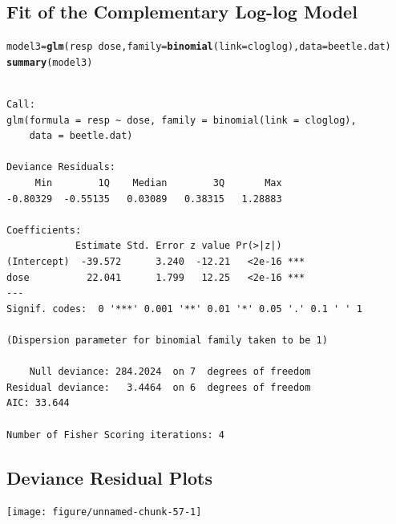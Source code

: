 \documentclass{article}\usepackage[]{graphicx}\usepackage[svgnames]{xcolor}
\makeatletter
\newcommand{\hlopt}[1]{\textcolor[rgb]{0,0,0}{#1}}%
\newcommand{\hlstd}[1]{\textcolor[rgb]{0.345,0.345,0.345}{#1}}%
\newcommand{\hlkwb}[1]{\textcolor[rgb]{0.69,0.353,0.396}{#1}}%
\newcommand{\hlkwc}[1]{\textcolor[rgb]{0.333,0.667,0.333}{#1}}%
\newcommand{\hlkwd}[1]{\textcolor[rgb]{0.737,0.353,0.396}{\textbf{#1}}}%
\newenvironment{kframe}{%
 \def\at@end@of@kframe{}%
 \ifinner\ifhmode%
  \def\at@end@of@kframe{\end{minipage}}%
  \begin{minipage}{\columnwidth}%
 \fi\fi%
 \def\FrameCommand##1{\hskip\@totalleftmargin \hskip-\fboxsep
 \colorbox{shadecolor}{##1}\hskip-\fboxsep
     \hskip-\linewidth \hskip-\@totalleftmargin \hskip\columnwidth}%
 \MakeFramed {\advance\hsize-\width
   \@totalleftmargin\z@ \linewidth\hsize
   \@setminipage}}%
 {\par\unskip\endMakeFramed%
 \at@end@of@kframe}
\newenvironment{knitrout}{}{} %
\makeatother
\begin{document}
\subsection*{Fit of the Complementary Log-log Model}
\begin{knitrout}
\color{fgcolor}\begin{kframe}
\begin{alltt}
\hlstd{model3} \hlkwb{=} \hlkwd{glm}\hlstd{(resp} \hlopt{~} \hlstd{dose,} \hlkwc{family} \hlstd{=} \hlkwd{binomial}\hlstd{(}\hlkwc{link} \hlstd{= cloglog),} \hlkwc{data} \hlstd{= beetle.dat)}
\hlkwd{summary}\hlstd{(model3)}
\end{alltt}
\begin{verbatim}

Call:
glm(formula = resp ~ dose, family = binomial(link = cloglog), 
    data = beetle.dat)

Deviance Residuals: 
     Min        1Q    Median        3Q       Max  
-0.80329  -0.55135   0.03089   0.38315   1.28883  

Coefficients:
            Estimate Std. Error z value Pr(>|z|)    
(Intercept)  -39.572      3.240  -12.21   <2e-16 ***
dose          22.041      1.799   12.25   <2e-16 ***
---
Signif. codes:  0 '***' 0.001 '**' 0.01 '*' 0.05 '.' 0.1 ' ' 1

(Dispersion parameter for binomial family taken to be 1)

    Null deviance: 284.2024  on 7  degrees of freedom
Residual deviance:   3.4464  on 6  degrees of freedom
AIC: 33.644

Number of Fisher Scoring iterations: 4
\end{verbatim}
\end{kframe}
\end{knitrout}
\subsection*{Deviance Residual Plots}
\begin{knitrout}
\color{fgcolor}

{\centering \texttt{[image: figure/unnamed-chunk-57-1]} 

}


\end{knitrout}
\end{document}

